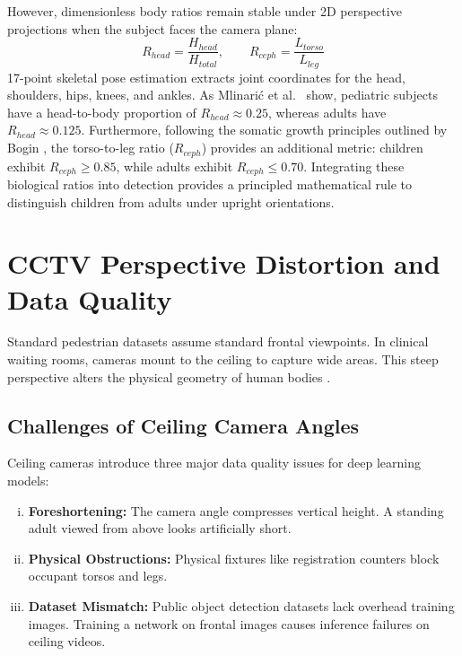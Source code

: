 However, dimensionless body ratios remain stable under 2D perspective projections when the subject faces the camera plane:
\begin{equation}
    R_{head} = \frac{H_{head}}{H_{total}}, \qquad R_{ceph} = \frac{L_{torso}}{L_{leg}}
\end{equation}
17-point skeletal pose estimation \cite{cao2019openpose} extracts joint coordinates for the head, shoulders, hips, knees, and ankles. As Mlinari\'{c} et al.\ \cite{mlinaric2024} show, pediatric subjects have a head-to-body proportion of $R_{head} \approx 0.25$, whereas adults have $R_{head} \approx 0.125$. Furthermore, following the somatic growth principles outlined by Bogin \cite{bogin1999}, the torso-to-leg ratio ($R_{ceph}$) provides an additional metric: children exhibit $R_{ceph} \ge 0.85$, while adults exhibit $R_{ceph} \le 0.70$. Integrating these biological ratios into detection provides a principled mathematical rule to distinguish children from adults under upright orientations.

\section{CCTV Perspective Distortion and Data Quality}
Standard pedestrian datasets assume standard frontal viewpoints. In clinical waiting rooms, cameras mount to the ceiling to capture wide areas. This steep perspective alters the physical geometry of human bodies \cite{osei2024}.

\subsection{Challenges of Ceiling Camera Angles}
Ceiling cameras introduce three major data quality issues for deep learning models:
\begin{enumerate}[(i)]
    \item \textbf{Foreshortening:} The camera angle compresses vertical height. A standing adult viewed from above looks artificially short.
    \item \textbf{Physical Obstructions:} Physical fixtures like registration counters block occupant torsos and legs.
    \item \textbf{Dataset Mismatch:} Public object detection datasets lack overhead training images. Training a network on frontal images causes inference failures on ceiling videos.
\end{enumerate}


